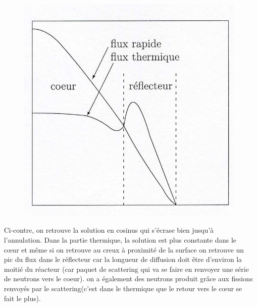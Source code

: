 	\begin{figure}
	\vspace{-5mm}
	\includegraphics[scale=0.23]{ch4/image1.png}
	\end{figure}
Ci-contre, on retrouve la solution en cosinus qui s'écrase bien jusqu'à l'annulation. Dans la 
partie thermique, la solution est plus constante dans le cœur et même si on retrouve au creux à 
proximité de la surface on retrouve un pic du flux dans le réflecteur car la longueur de diffusion
doit être d'environ la moitié du réacteur (car paquet de scattering qui va se faire en renvoyer 
une série de neutrons vers le coeur). on a également des neutrons produit grâce aux fissions 
renvoyés par le scattering(c'est dans le thermique que le retour vers le cœur se fait le plus).

























